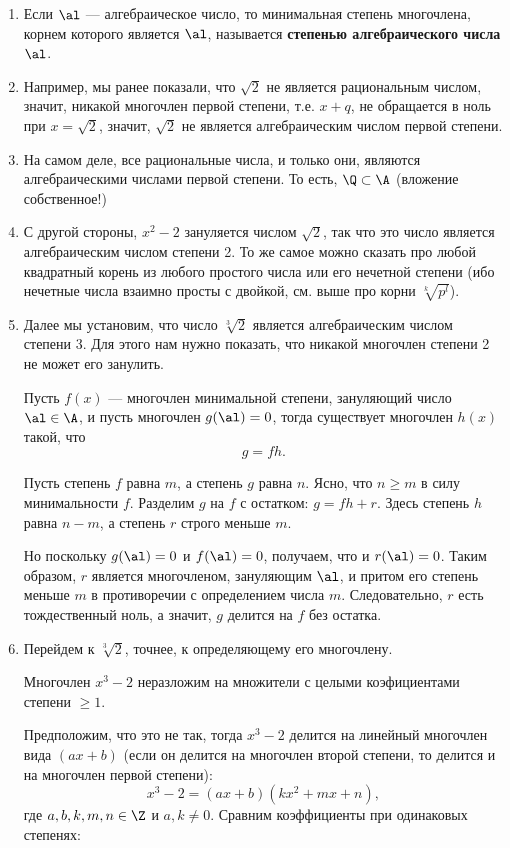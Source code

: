 \begin{enumerate}


\item Если $\al$ --- алгебраическое число, то минимальная степень многочлена, корнем которого является $\al$, называется \textbf{степенью алгебраического числа} $\al$.
\item Например, мы ранее показали, что $\sqrt 2$ не является рациональным числом, значит, никакой многочлен первой степени, т.е. $x+q$, не обращается в ноль при $x=\sqrt 2$, значит, $\sqrt 2$ не является алгебраическим числом первой степени. 
\item На самом деле, все рациональные числа, и только они, являются алгебраическими числами первой степени. То есть, $\Q\subset\A$ (вложение собственное!)
\item С другой стороны, $x^2-2$ зануляется числом $\sqrt 2$, так что это число является алгебраическим числом степени 2. То же самое можно сказать про любой квадратный корень из любого простого числа или его нечетной степени (ибо нечетные числа взаимно просты с двойкой, см. выше про корни $\sqrt[k]{p^l}$).
\item Далее мы установим, что число $\sqrt[3]{2}$ является алгебраическим числом степени 3. Для этого нам нужно показать, что никакой многочлен степени 2 не может его занулить.
\begin{lem}\label{gfh}
Пусть $f(x)$ --- многочлен минимальной степени, зануляющий число $\al\in\A$, и пусть многочлен $g(\al)=0$, тогда существует многочлен $h(x)$ такой, что
$$
g=fh.
$$
\end{lem}
\pf
Пусть степень $f$ равна $m$, а степень $g$ равна $n$. Ясно, что $n\ge m$ в силу минимальности $f$.
Разделим $g$ на $f$ с остатком: $g=fh+r$. Здесь степень $h$ равна $n-m$, а степень $r$ строго меньше $m$.

Но поскольку $g(\al)=0$ и $f(\al)=0$, получаем, что и $r(\al)=0$. Таким образом, $r$ является многочленом, зануляющим $\al$, и притом его степень меньше $m$ в противоречии с определением числа $m$. Следовательно, $r$ есть тождественный ноль, а значит, $g$ делится на $f$ без остатка.
\epf
\item Перейдем к $\sqrt[3]{2}$, точнее, к определяющему его многочлену.
\begin{lem}
Многочлен $x^3-2$ неразложим на множители с целыми коэфициентами степени $\ge 1$.
\end{lem}
\pf Предположим, что это не так, тогда $x^3-2$ делится на линейный многочлен вида $(ax+b)$ (если он делится на многочлен второй степени, то делится и на многочлен первой степени):
$$
x^3-2 = (ax+b)(kx^2+mx+n),
$$
где $a,b,k,m,n\in\Z$ и $a,k\ne 0$. Сравним коэффициенты при одинаковых степенях:


\end{enumerate}
